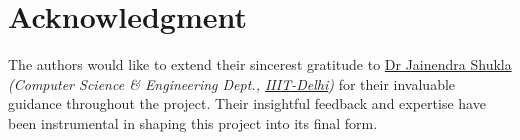 \documentclass[10pt,twocolumn,letterpaper]{article}
\begin{document}
\section*{Acknowledgment}
    The authors would like to extend their sincerest gratitude to \href{https://www.iiitd.ac.in/jainendra}{Dr Jainendra Shukla} \textit{(Computer Science \& Engineering Dept., \href{https://www.iiitd.ac.in/}{IIIT-Delhi})} for their invaluable guidance throughout the project.
    Their insightful feedback and expertise have been instrumental in shaping this project into its final form.

\newpage




\nocite{*}
\end{document}
